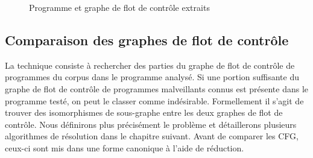 \begin{figure}[h]
\begin{center}
\end{center}
\caption{Programme et graphe de flot de contrôle extraits}
\label{fig:am_prog}
\end{figure}



\subsection{Comparaison des graphes de flot de contrôle}
La technique consiste à rechercher des parties du graphe de flot de contrôle de programmes du corpus dans le programme analysé.
Si une portion suffisante du graphe de flot de contrôle de programmes malveillants connus est présente dans le programme testé, on peut le classer comme indésirable. Formellement il s'agit de trouver des isomorphismes de sous-graphe entre les deux graphes de flot de contrôle. Nous définirons plus précisément le problème et détaillerons plusieurs algorithmes de résolution dans le chapitre suivant. Avant de comparer les CFG, ceux-ci sont mis dans une forme canonique à l'aide de réduction.

